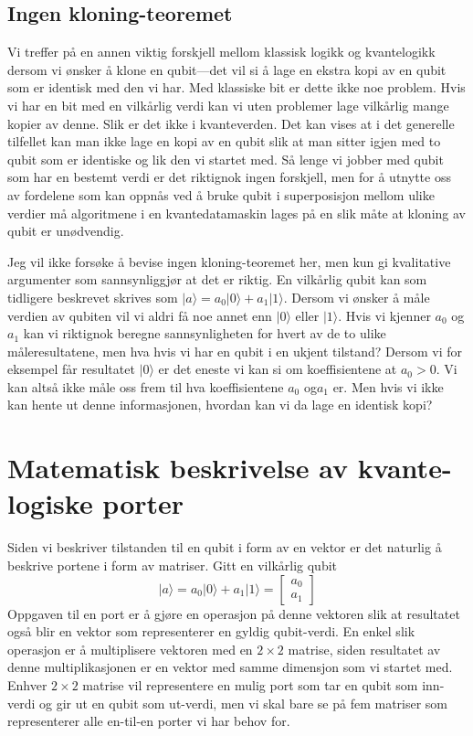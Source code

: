 \subsection{Ingen kloning-teoremet}
Vi treffer på en annen viktig forskjell mellom klassisk logikk og kvantelogikk dersom vi ønsker å klone en qubit---det vil si å lage en ekstra kopi av en qubit som er identisk med den vi har. Med klassiske bit er dette ikke noe problem. Hvis vi har en bit med en vilkårlig verdi kan vi uten problemer lage vilkårlig mange kopier av denne. Slik er det ikke i kvanteverden. Det kan vises at i det generelle tilfellet kan man ikke lage en kopi av en qubit slik at man sitter igjen med to qubit som er identiske og lik den vi startet med. Så lenge vi jobber med qubit som har en bestemt verdi er det riktignok ingen forskjell, men for å utnytte oss av fordelene som kan oppnås ved å bruke qubit i superposisjon mellom ulike verdier må algoritmene i en kvantedatamaskin lages på en slik måte at kloning av qubit er unødvendig.

Jeg vil ikke forsøke å bevise ingen kloning-teoremet her, men kun gi kvalitative argumenter som sannsynliggjør at det er riktig. En vilkårlig qubit kan som tidligere beskrevet skrives som $|a\rangle = a_0|0\rangle + a_1|1\rangle$. Dersom vi ønsker å måle verdien av qubiten vil vi aldri få noe annet enn $|0\rangle$ eller $|1\rangle$. Hvis vi kjenner $a_0$ og $a_1$ kan vi riktignok beregne sannsynligheten for hvert av de to ulike måleresultatene, men hva hvis vi har en qubit i en ukjent tilstand? Dersom vi for eksempel får resultatet $|0\rangle$ er det eneste vi kan si om koeffisientene at $a_0>0$. Vi kan altså ikke måle oss frem til hva koeffisientene $a_0$ og$a_1$ er. Men hvis vi ikke kan hente ut denne informasjonen, hvordan kan vi da lage en identisk kopi? 

\section{Matematisk beskrivelse av kvante-logiske porter}
Siden vi beskriver tilstanden til en qubit i form av en vektor er det naturlig å beskrive portene i form av matriser. Gitt en vilkårlig qubit 
\begin{displaymath}
	|a\rangle = a_0 |0\rangle + a_1|1\rangle = \left[\begin{array}{c} a_0 \\ a_1 \end{array}\right]
\end{displaymath}
Oppgaven til en port er å gjøre en operasjon på denne vektoren slik at resultatet også blir en vektor som representerer en gyldig qubit-verdi. En enkel slik operasjon er å multiplisere vektoren med en $2\times 2$ matrise, siden resultatet av denne multiplikasjonen er en vektor med samme dimensjon som vi startet med. Enhver $2\times2$ matrise vil representere en mulig port som tar en qubit som inn-verdi og gir ut en qubit som ut-verdi, men vi skal bare se på fem matriser som representerer alle en-til-en porter vi har behov for. 

